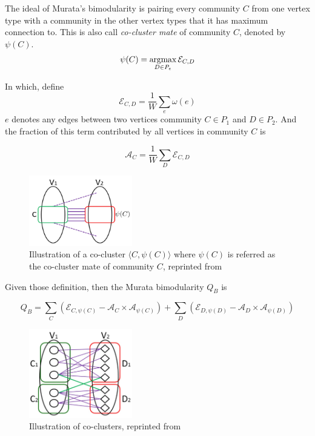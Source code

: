 The ideal of Murata's bimodularity is pairing every community $C$ from one vertex type with a community in the other vertex types
that it has maximum connection to.
This is also call \textit{co-cluster mate} of community $C$, denoted by $\psi(C)$.
\begin{equation}
	\psi(C) = \operatorname*{argmax}_{D \in P_e} \mathcal{E}_{C, D}
\end{equation}

In which, define
\begin{equation}
	\mathcal{E}_{C, D} = \frac{1}{W} \sum_{e} \omega (e)
\end{equation}
$e$ denotes any edges between two vertices community $C\in P_1$ and $D\in P_2$.
And the fraction of this term contributed by all vertices in community $C$ is

\begin{equation}
	\mathcal{A}_C = \frac{1}{W} \sum_{D} \mathcal{E}_{C, D}
\end{equation}

\begin{figure}[H]
	\centering
	\includegraphics[width=0.4\textwidth]{images/cocluster.png}
	\caption[Illustration of a co-cluster]{
		Illustration of a co-cluster
		$\langle C, \psi(C) \rangle$
		where $\psi(C)$ is referred as the co-cluster mate of community $C$,
		reprinted from \parencite{pesantez2018}
	}
	\label{fig:co-cluster}
\end{figure}

Given those definition, then the Murata bimodularity $Q_B$ is

\begin{equation}
	\label{eq:murata-bimodularity}
	Q_B = \sum_C \left(\mathcal{E}_{C, \psi(C)} - \mathcal{A}_C \times \mathcal{A}_{\psi(C)}\right)
	+ \sum_D \left(\mathcal{E}_{D, \psi(D)} - \mathcal{A}_D \times \mathcal{A}_{\psi(D)}\right)
\end{equation}

\begin{figure}[H]
	\centering
	\includegraphics[width=0.4\textwidth]{images/cocluster2.png}
	\caption[Illustration of co-clusters]{
		Illustration of co-clusters, reprinted from \parencite{pesantez2018}
	}
	\label{fig:cocluster2}
\end{figure}


